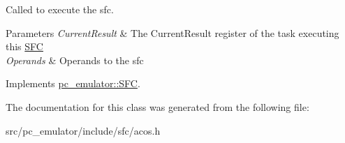 Called to execute the sfc. 


\begin{DoxyParams}{Parameters}
{\em Current\+Result} & The Current\+Result register of the task executing this \hyperlink{classpc__emulator_1_1SFC}{S\+FC} \\
\hline
{\em Operands} & Operands to the sfc \\
\hline
\end{DoxyParams}


Implements \hyperlink{classpc__emulator_1_1SFC_ab206c80fc0e429c56672b4f6a0ca8635}{pc\+\_\+emulator\+::\+S\+FC}.



The documentation for this class was generated from the following file\+:\begin{DoxyCompactItemize}
\item 
src/pc\+\_\+emulator/include/sfc/acos.\+h\end{DoxyCompactItemize}
